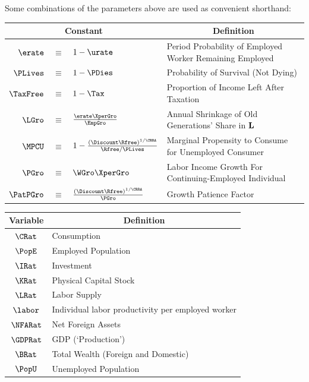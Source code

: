 \documentclass[titlepage]{\econtex}\newcommand{\texname}{cjSOE}
\begin{document}
Some combinations of the parameters above are used as convenient shorthand:
\begin{center}
\begin{tabular}{|rcl|l|} \hline
 \multicolumn{3}{|c|}{Constant} & \multicolumn{1}{c|}{Definition}  \\ \hline
 $\erate$ & $\equiv$ & $1-\urate$ & Period Probability of Employed Worker Remaining Employed \\
 $\PLives$ & $\equiv$ & $1-\PDies$ & Probability of Survival (Not Dying) \\
 $\TaxFree$ & $\equiv$ & $1-\Tax$ & Proportion of Income Left After Taxation \\
 $\LGro$ & $\equiv$ & $\frac{\erate\XperGro}{\EmpGro}$ & Annual Shrinkage of Old Generations' Share in $\mathbf{L}$ \\
 $\MPCU$ & $\equiv$ & $1- \frac{(\Discount \Rfree)^{1/\CRRA}}{\Rfree/\PLives}$ & Marginal Propensity to Consume for Unemployed Consumer \\
 $\PGro$ & $\equiv$ & $\WGro \XperGro$ & Labor Income Growth For Continuing-Employed Individual \\
 $\PatPGro$ & $\equiv$ & $\frac{(\Discount \Rfree)^{1/\CRRA}}{\PGro}$ & Growth Patience Factor \\
\hline
\end{tabular}
\end{center}

\begin{center}
\begin{tabular}{|c|l|} \hline
 Variable & \multicolumn{1}{|c|}{Definition}  \\ \hline
 $\CRat$ & Consumption \\
 $\PopE$ & Employed Population \\
 $\IRat$ & Investment \\
 $\KRat$ & Physical Capital Stock \\
 $\LRat$ & Labor Supply \\
 $\labor$ & Individual labor productivity per employed worker \\
 $\NFARat$ & Net Foreign Assets \\
 $\GDPRat$ & GDP (`Production') \\
 $\BRat$ & Total Wealth (Foreign and Domestic) \\
 $\PopU$ & Unemployed Population \\
\hline
\end{tabular}
\end{center}
\end{document}
